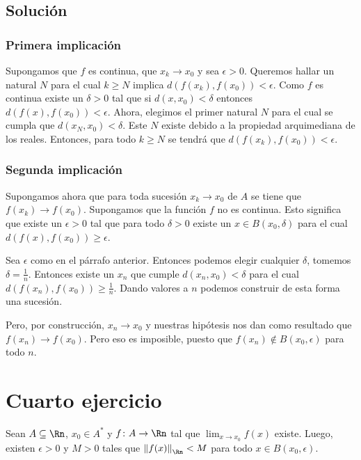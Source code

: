 \documentclass{scrartcl}
\begin{document}
\subsection{Solución}

\subsubsection{Primera implicación}

Supongamos que \(f\) es continua, que \(x_k\to x_0\)
y sea \(\epsilon>0\).
Queremos hallar un natural \(N\) para el cual \(k\geq N\)
implica \(d(f(x_k),f(x_0)) < \epsilon\).
Como \(f\) es continua existe un \(\delta >0\) tal que
si \(d(x,x_0) < \delta\) 
entonces \(d(f(x),f(x_0)) < \epsilon\).
Ahora, elegimos el primer natural \(N\) para el cual
se cumpla que \(d(x_N,x_0) < \delta\). Este \(N\)
existe debido a la propiedad arquimediana de los reales.
Entonces, para todo \(k\geq N\) se tendrá que
\(d(f(x_k),f(x_0)) < \epsilon\).

\subsubsection{Segunda implicación}

Supongamos ahora que para toda sucesión \(x_k\to x_0\)
de \(A\) se tiene que \(f(x_k)\to f(x_0)\).
Supongamos que la función \(f\) no es continua.
Esto significa que existe un \(\epsilon > 0\) tal que
para todo \(\delta > 0\) existe un \(x\in B(x_0,\delta)\)
para el cual \(d(f(x),f(x_0)) \geq \epsilon\).

Sea \(\epsilon\) como en el párrafo anterior.
Entonces podemos elegir cualquier \(\delta\),
tomemos \(\delta = \frac{1}{n}\).
Entonces existe un \(x_n\) que cumple \(d(x_n,x_0) <\delta\)
para el cual \(d(f(x_n),f(x_0))\geq\frac{1}{n}\).
Dando valores a \(n\) podemos construir de esta forma
una sucesión.

Pero, por construcción, \(x_n\to x_0\) y nuestras hipótesis
nos dan como resultado que \(f(x_n)\to f(x_0)\).
Pero eso es imposible, puesto
que \(f(x_n)\not\in B(x_0,\epsilon)\) para todo \(n\).

\section{Cuarto ejercicio}

Sean \(A\subseteq\Rn\), \(x_{0}\in A^{\ast}\)
y \(f\colon A \to\Rn\) tal que
\(\lim_{x\to x_{0}} f(x)\)  existe.
Luego, existen \(\epsilon>0\) y \(M>0\) tales
que \(\left\lVert f(x) \right\rVert_{\Rn} < M\) 
para todo \(x\in B(x_0,\epsilon)\).
\end{document}
